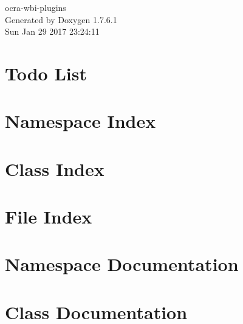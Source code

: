 \documentclass[a4paper]{book}
\begin{document}
\hypersetup{pageanchor=false,citecolor=blue}
\begin{titlepage}
\vspace*{7cm}
\begin{center}
{\Large ocra-\/wbi-\/plugins }\\
\vspace*{1cm}
{\large \-Generated by Doxygen 1.7.6.1}\\
\vspace*{0.5cm}
{\small Sun Jan 29 2017 23:24:11}\\
\end{center}
\end{titlepage}
\clearemptydoublepage
{}
\tableofcontents
\clearemptydoublepage
{}
\hypersetup{pageanchor=true,citecolor=blue}
\chapter{\-Todo \-List}
\label{todo}
\hypertarget{todo}{}

\chapter{\-Namespace \-Index}

\chapter{\-Class \-Index}

\chapter{\-File \-Index}

\chapter{\-Namespace \-Documentation}

\chapter{\-Class \-Documentation}























\end{document}
